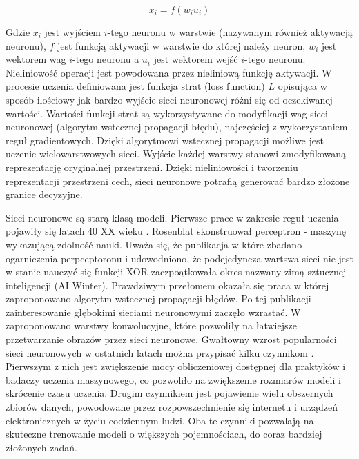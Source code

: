 \documentclass[oneside, mag]{mgr}
\begin{document}
\begin{equation}
	x_i = f(w_i u_i)
\end{equation}

Gdzie $x_i$ jest wyjściem $i$-tego neuronu w warstwie (nazywanym również aktywacją neuronu), $f$ jest funkcją aktywacji w warstwie do której należy neuron, $w_i$ jest wektorem wag $i$-tego neuronu a $u_i$ jest wektorem wejść $i$-tego neuronu. Nieliniowość operacji jest powodowana przez nieliniową funkcję aktywacji. W procesie uczenia definiowana jest funkcja strat (loss function) $L$ opisująca w sposób ilościowy jak bardzo wyjście sieci neuronowej różni się od oczekiwanej wartości. Wartości funkcji strat są wykorzystywane do modyfikacji wag sieci neuronowej (algorytm wstecznej propagacji błędu), najczęściej z wykorzystaniem reguł gradientowych. Dzięki algorytmowi wstecznej propagacji możliwe jest uczenie wielowarstwowych sieci. Wyjście każdej warstwy stanowi zmodyfikowaną reprezentację oryginalnej przestrzeni. Dzięki nieliniowości i tworzeniu reprezentacji przestrzeni cech, sieci neuronowe potrafią generować bardzo złożone granice decyzyjne.

Sieci neuronowe są starą klasą modeli. Pierwsze prace w zakresie reguł uczenia pojawiły się latach 40 XX wieku \cite{McCulloch-Pitts} \cite{Hebb}. Rosenblat \cite{Rosenblatt} skonstruował perceptron - maszynę wykazującą zdolność nauki. Uważa się, że publikacja w które zbadano ogarniczenia perpceptoronu i udowodniono, że podejedyncza wartswa sieci nie jest w stanie nauczyć się funkcji XOR \cite{Perceptrons} zaczpoątkowała okres nazwany zimą sztucznej inteligencji (AI Winter). Prawdziwym przełomem okazała się praca \cite{Rumelhart} w której zaproponowano algorytm wstecznej propagacji błędów. Po tej publikacji zainteresowanie głębokimi sieciami neuronowymi zaczęło wzrastać. W \cite{Conv} zaproponowano warstwy konwolucyjne, które pozwoliły na łatwiejsze przetwarzanie obrazów przez sieci neuronowe. 
Gwałtowny wzrost popularności sieci neuronowych w ostatnich latach można przypisać kilku czynnikom \cite{Goodfellow-et-al-2016}. Pierwszym z nich jest zwiększenie mocy obliczeniowej dostępnej dla praktyków i badaczy uczenia maszynowego, co pozwoliło na zwiększenie rozmiarów modeli i skrócenie czasu uczenia. Drugim czynnikiem jest pojawienie wielu obszernych zbiorów danych, powodowane przez rozpowszechnienie się internetu i urządzeń elektronicznych w życiu codziennym ludzi. Oba te czynniki pozwalają na skuteczne trenowanie modeli o większych pojemnościach, do coraz bardziej złożonych zadań.
\end{document}
